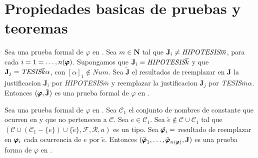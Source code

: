 

\section{Propiedades basicas de pruebas y teoremas}

\begin{lemma}
  Sea \padec una prueba formal de $\varphi$ en \forder. Sea $m\in\mathbf{N}$ tal que 
  $\mathbf{J}_i\neq\emph{HIPOTESIS}\overline{m}$, para cada $i=1=\dots,n(\pmb{\varphi})$. Supongamos
  que $\mathbf{J}_i=\emph{HIPOTESIS}\overline{k}$ y que $\mathbf{J}_j=\emph{TESIS}\overline{k}\alpha$,
  con $[\alpha]_1\not\in Num$. Sea $\tilde{\mathbf{J}}$ el resultados de reemplazar en $\mathbf{J}$
  la justificacion $\mathbf{J}_i$ por \emph{HIPOTESIS}$\overline{m}$ y reemplazar la justificacion $\mathbf{J}_j$
  por \emph{TESIS}$\overline{m}\alpha$. Entonces $(\pmb{\varphi},\tilde{\mathbf{J}})$ es una prueba formal de 
  $\varphi$ en \forder.
\end{lemma}
\noproof

\begin{lemma}
  Sea \padec una prueba formal de $\varphi$ en \forder. Sea $\mathcal{C}_1$ el conjunto de nombres de constante 
  que ocurren en \pvarphi y que no pertenecen a $\mathcal{C}$. Sea $e\in \mathcal{C}_1$. Sea $\tilde{e}\not\in\mathcal{C}\cup\mathcal{C}_1$
  tal que $(\mathcal{C}\cup(\mathcal{C}_1-\{e\})\cup\{\tilde{e}\},\mathcal{F},\mathcal{R},a)$ es un tipo.
  Sea $\tilde{\pmb{\varphi}_i}=$ resultado de reemplazar en $\pmb{\varphi}_i$ cada ocurrencia de $e$ por $\tilde{e}$.
  Entonces $(\tilde{\pmb{\varphi}}_{1}, \dots, \tilde{\pmb{\varphi}}_{n(\pmb{\varphi})},\mathbf{J})$ es una prueba forma de $\varphi$ en \forder.
\end{lemma}
\noproof

